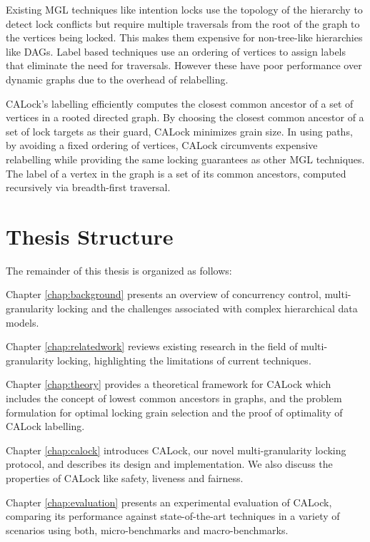 Existing MGL techniques like intention locks \cite{gray1975granularity} use the topology of the hierarchy to detect lock conflicts but require multiple traversals from the root of the graph to the vertices being locked. 
This makes them expensive for non-tree-like hierarchies like DAGs. Label based techniques \cite{kalikar2016domlock,anjuMID,kalikar_toggle_2019,FlexiGran2024} use an ordering of vertices to assign labels that eliminate the need for traversals. However these have poor performance over dynamic graphs due to the overhead of relabelling. 


CALock's labelling efficiently computes the closest common ancestor of a set of vertices in a rooted directed graph. 
By choosing the closest common ancestor of a set of lock targets as their guard, CALock minimizes grain size. 
In using paths, by avoiding a fixed ordering of vertices, CALock circumvents expensive relabelling while providing the same locking guarantees as other MGL techniques. 
The label of a vertex in the graph is a set of its common ancestors, computed recursively via breadth-first traversal.



\section{Thesis Structure}
The remainder of this thesis is organized as follows:

 Chapter \ref{chap:background} presents an overview of concurrency control, multi-granularity locking and the challenges associated with complex hierarchical data models. 

 Chapter \ref{chap:relatedwork} reviews existing research in the field of multi-granularity locking, highlighting the limitations of current techniques. 

 Chapter \ref{chap:theory} provides a theoretical framework for CALock which includes the concept of lowest common ancestors in graphs, and the problem formulation for optimal locking grain selection and the proof of optimality of CALock labelling.

 Chapter \ref{chap:calock} introduces CALock, our novel multi-granularity locking protocol, and describes its design and implementation. We also discuss the properties of CALock like safety, liveness and fairness.

 Chapter \ref{chap:evaluation} presents an experimental evaluation of CALock, comparing its performance against state-of-the-art techniques in a variety of scenarios using both, micro-benchmarks and macro-benchmarks.
 
